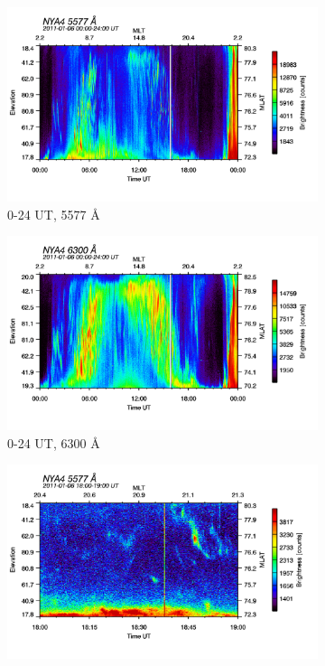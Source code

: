 \documentclass[10pt,a4paper]{article}
\begin{document}
\begin{figure}[h]
	\begin{subfigure}{.5\textwidth}
		\centering
		\includegraphics[width=.8\linewidth]{am-0024-5577.png}
		\caption{0-24 UT, 5577 Å}
		\label{fig:sfig1}
	\end{subfigure}
	\begin{subfigure}{.5\textwidth}
		\centering
		\includegraphics[width=.8\linewidth]{am-0024-6300.png}
		\caption{0-24 UT, 6300 Å}
		\label{fig:sfig2}
	\end{subfigure}
	\begin{subfigure}{.5\textwidth}
		\centering
		\includegraphics[width=.8\linewidth]{am-1819-5577.png}

\end{subfigure}
\end{figure}
\end{document}
